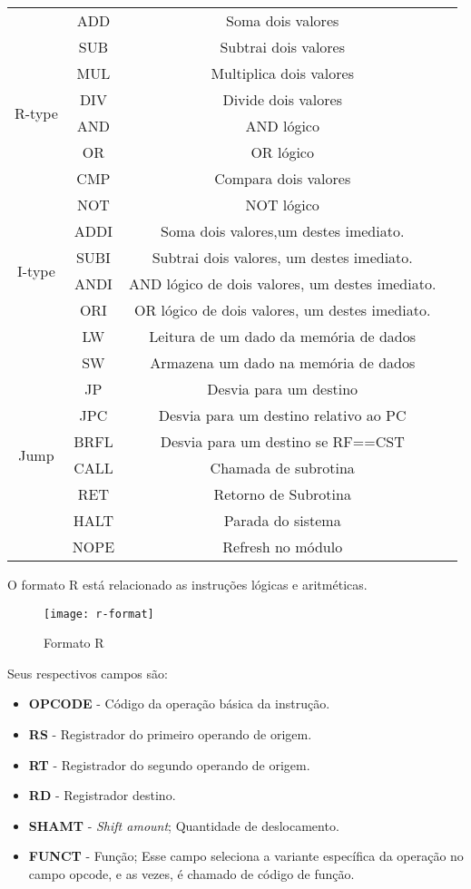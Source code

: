 \begin{center}
\begin{longtable}[pos]{| c | c | c | m{7cm} |}
			\multirow{8}{*}{R-type} & ADD & Soma dois valores \\ \cline{2-3}	
	& SUB & Subtrai dois valores \\ \cline{2-3}	
	& MUL & Multiplica dois valores \\ \cline{2-3}	
	& DIV & Divide dois valores \\ \cline{2-3}
	& AND & AND lógico \\ \cline{2-3}
	& OR & OR lógico  \\ \cline{2-3}
	& CMP & Compara dois valores \\ \cline{2-3}
	& NOT & NOT lógico \\ \hline 
	\multirow{4}{*}{I-type} & ADDI & Soma dois valores,um destes imediato. \\ \cline{2-3}
	& SUBI & Subtrai dois valores, um destes imediato. \\ \cline{2-3}
	& ANDI & AND lógico de dois valores, um destes imediato. \\ \cline{2-3}
	& ORI & OR lógico de dois valores, um destes imediato. \\ \cline{2-3}
	& LW & Leitura de um dado da memória de dados \\ \cline{2-3}
	& SW & Armazena um dado na memória de dados \\ \hline
	\multirow{6}{*}{Jump} & JP & Desvia para um destino \\ \cline{2-3}
	& JPC & Desvia para um destino relativo ao PC \\ \cline{2-3}
	& BRFL & Desvia para um destino se RF==CST \\ \cline{2-3}
	& CALL & Chamada de subrotina \\ \cline{2-3}
	& RET & Retorno de Subrotina \\ \cline{2-3}
	& HALT & Parada do sistema \\ \cline{2-3}
	& NOPE & Refresh no módulo \\ \hline
\end{longtable}
\end{center}


	O formato R está relacionado as instruções lógicas e aritméticas.
	\begin{figure}[H]
    	\centering
    	\texttt{[image: r-format]}
    	\caption{Formato R}
		\label{r_format}
	\end{figure}
	Seus respectivos campos são:
	\begin{itemize}
	\item \textbf{OPCODE} - Código da operação básica da instrução.
	\item \textbf{RS} - Registrador do primeiro operando de origem.
	\item \textbf{RT} - Registrador do segundo operando de origem.
	\item \textbf{RD} - Registrador destino.
	\item \textbf{SHAMT} - \textit{Shift amount}; Quantidade de deslocamento.
	\item \textbf{FUNCT} - Função; Esse campo seleciona a variante específica da operação no campo opcode, e as vezes, é chamado de código de função.
\end{itemize}	

